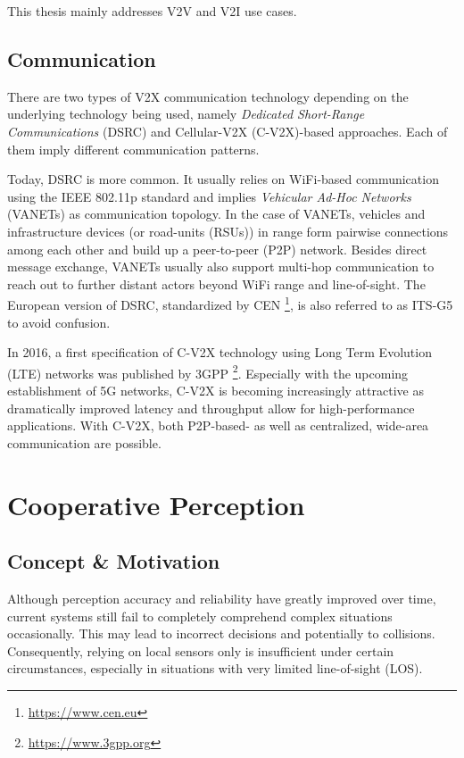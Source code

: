 This thesis mainly addresses V2V and V2I use cases.

\subsection{Communication}
\label{subsec:background:communication}
There are two types of V2X communication technology depending on the underlying technology being used, namely \textit{Dedicated Short-Range Communications} (DSRC) and Cellular-V2X (C-V2X)-based approaches. Each of them imply different communication patterns.

Today, DSRC is more common. It usually relies on WiFi-based communication using the IEEE 802.11p standard and implies \textit{Vehicular Ad-Hoc Networks} (VANETs) as communication topology. In the case of VANETs, vehicles and infrastructure devices (or road-units (RSUs)) in range form pairwise connections among each other and build up a peer-to-peer (P2P) network. Besides direct message exchange, VANETs usually also support multi-hop communication to reach out to further distant actors beyond WiFi range and line-of-sight. The European version of DSRC, standardized by CEN \footnote{\url{https://www.cen.eu}}, is also referred to as ITS-G5 to avoid confusion. 

In 2016, a first specification of C-V2X technology using Long Term Evolution (LTE) networks was published by 3GPP \footnote{\url{https://www.3gpp.org}}. Especially with the upcoming establishment of 5G networks, C-V2X is becoming increasingly attractive as dramatically improved latency and throughput allow for high-performance applications. With C-V2X, both P2P-based- as well as centralized, wide-area communication are possible. 

\section{Cooperative Perception}
\label{sec:background:cooperative_perception}

\subsection{Concept \& Motivation}
\label{subsec:background:concept_motivation}
Although perception accuracy and reliability have greatly improved over time, current systems still fail to completely comprehend complex situations occasionally. This may lead to incorrect decisions and potentially to collisions. Consequently, relying on local sensors only is insufficient under certain circumstances, especially in situations with very limited line-of-sight (LOS).

